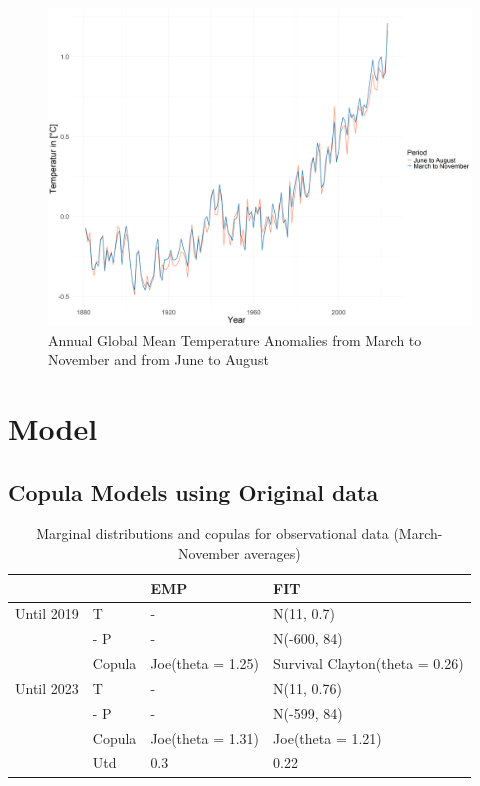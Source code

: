 \documentclass[
]{krantz}
\begin{document}
\begin{figure}

{\centering \includegraphics[width=0.7\linewidth]{work/03-compounds/figures/GMT/GMT} 

}

\caption{Annual Global Mean Temperature Anomalies from March to November and from June to August}\label{fig:gmt-shiyu}
\end{figure}

\section{Model}\label{model}

\subsection{Copula Models using Original data}\label{copula-models-using-original-data}

\begin{table}

\caption{\label{tab:tab1-shiyu}Marginal distributions and copulas for observational data (March-November averages)}
\centering
\begin{tabular}[t]{l|l|l|l}
\hline
 &  & EMP & FIT\\
\hline
Until 2019 & T & - & N(11, 0.7)\\
\hline
 & - P & - & N(-600, 84)\\
\hline
 & Copula & Joe(theta = 1.25) & Survival Clayton(theta = 0.26)\\
\hline
Until 2023 & T & - & N(11, 0.76)\\
\hline
 & - P & - & N(-599, 84)\\
\hline
 & Copula & Joe(theta = 1.31) & Joe(theta = 1.21)\\
\hline
 & Utd & 0.3 & 0.22\\
\hline
\end{tabular}
\end{table}
\end{document}
